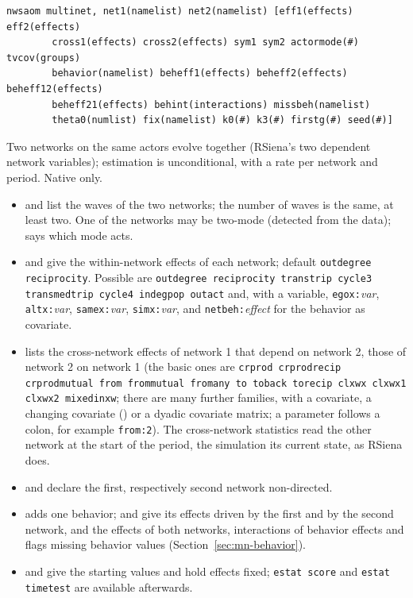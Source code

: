 \begin{lstlisting}
nwsaom multinet, net1(namelist) net2(namelist) [eff1(effects) eff2(effects)
        cross1(effects) cross2(effects) sym1 sym2 actormode(#) tvcov(groups)
        behavior(namelist) beheff1(effects) beheff2(effects) beheff12(effects)
        beheff21(effects) behint(interactions) missbeh(namelist)
        theta0(numlist) fix(namelist) k0(#) k3(#) firstg(#) seed(#)]
\end{lstlisting}
Two networks on the same actors evolve together (RSiena's two dependent network variables); estimation is unconditional, with a rate per network and period. Native only.
\begin{itemize}[nosep]
  \item {} and  list the waves of the two networks; the number of waves is the same, at least two. One of the networks may be two-mode (detected from the data);  says which mode acts.
  \item {} and  give the within-network effects of each network; default \texttt{outdegree reciprocity}. Possible are \texttt{outdegree reciprocity transtrip cycle3 transmedtrip cycle4 indegpop outact} and, with a variable, \texttt{egox:}\emph{var}, \texttt{altx:}\emph{var}, \texttt{samex:}\emph{var}, \texttt{simx:}\emph{var}, and \texttt{netbeh:}\emph{effect} for the behavior as covariate.
  \item {} lists the cross-network effects of network 1 that depend on network 2,  those of network 2 on network 1 (the basic ones are \texttt{crprod crprodrecip crprodmutual from frommutual fromany to toback torecip clxwx clxwx1 clxwx2 mixedinxw}; there are many further families, with a covariate, a changing covariate () or a dyadic covariate matrix; a parameter follows a colon, for example \texttt{from:2}). The cross-network statistics read the other network at the start of the period, the simulation its current state, as RSiena does.
  \item {} and  declare the first, respectively second network non-directed.
  \item {} adds one behavior;  and  give its effects driven by the first and by the second network,  and  the effects of both networks,  interactions of behavior effects and  flags missing behavior values (Section~\ref{sec:mn-behavior}).
  \item {} and  give the starting values and hold effects fixed; \texttt{estat score} and \texttt{estat timetest} are available afterwards.
\end{itemize}

